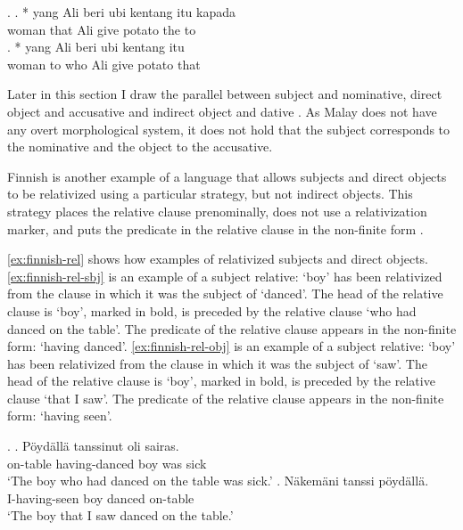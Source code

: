\ex.\label{ex:malay-no-io}
\ag. * yang Ali beri {ubi kentang} itu kapada\\
 woman that Ali give potato the to\\\label{ex:malay-no-io1}
\bg. *  yang Ali beri {ubi kentang} itu\\
 woman to who Ali give potato that\\\label{ex:malay-no-io2}

Later in this section I draw the parallel between subject and nominative, direct object and accusative and indirect object and dative \citep[after][]{caha2009}. As Malay does not have any overt morphological system, it does not hold that the subject corresponds to the nominative and the object to the accusative.

Finnish is another example of a language that allows subjects and direct objects to be relativized using a particular strategy, but not indirect objects. This strategy places the relative clause prenominally, does not use a relativization marker, and puts the predicate in the relative clause in the non-finite form \citep{keenan1977}.

\ref{ex:finnish-rel} shows how examples of relativized subjects and direct objects.
\ref{ex:finnish-rel-sbj} is an example of a subject relative:  `boy' has been relativized from the clause in which it was the subject of  `danced'. The head of the relative clause is  `boy', marked in bold, is preceded by the relative clause  `who had danced on the table'. The predicate of the relative clause appears in the non-finite form:  `having danced'.
\ref{ex:finnish-rel-obj} is an example of a subject relative:  `boy' has been relativized from the clause in which it was the subject of  `saw'. The head of the relative clause is  `boy', marked in bold, is preceded by the relative clause  `that I saw'. The predicate of the relative clause appears in the non-finite form:  `having seen'.

\ex.\label{ex:finnish-rel}
\ag. Pöydällä tanssinut  oli sairas.\\
 on-table having-danced boy was sick\\
 `The boy who had danced on the table was sick.'\label{ex:finnish-rel-sbj}
\bg. Näkemäni  tanssi pöydällä.\\
 I-having-seen boy danced on-table\\
 `The boy that I saw danced on the table.'\label{ex:finnish-rel-obj}

